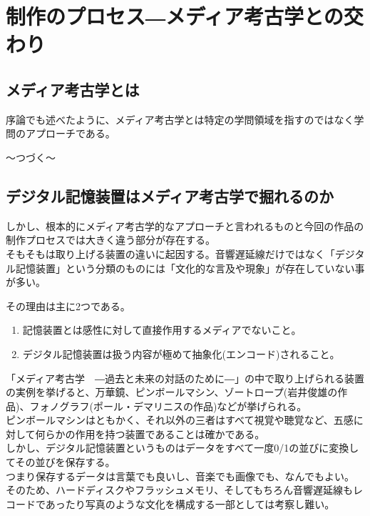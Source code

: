 \chapter{制作のプロセス―メディア考古学との交わり}\label{ux5236ux4f5cux306eux30d7ux30edux30bbux30b9ux30e1ux30c7ux30a3ux30a2ux8003ux53e4ux5b66ux3068ux306eux4ea4ux308fux308a}

\section{メディア考古学とは}\label{ux30e1ux30c7ux30a3ux30a2ux8003ux53e4ux5b66ux3068ux306f}

序論でも述べたように、メディア考古学とは特定の学問領域を指すのではなく学問のアプローチである。

〜つづく〜

\section{デジタル記憶装置はメディア考古学で掘れるのか}\label{ux30c7ux30b8ux30bfux30ebux8a18ux61b6ux88c5ux7f6eux306fux30e1ux30c7ux30a3ux30a2ux8003ux53e4ux5b66ux3067ux6398ux308cux308bux306eux304b}

しかし、根本的にメディア考古学的なアプローチと言われるものと今回の作品の制作プロセスでは大きく違う部分が存在する。\\
そもそもは取り上げる装置の違いに起因する。音響遅延線だけではなく「デジタル記憶装置」という分類のものには「文化的な言及や現象」が存在していない事が多い。

その理由は主に2つである。

\begin{enumerate}
\def\labelenumi{\arabic{enumi}.}
\tightlist
\item
  記憶装置とは感性に対して直接作用するメディアでないこと。
\item
  デジタル記憶装置は扱う内容が極めて抽象化(エンコード)されること。
\end{enumerate}

「メディア考古学　―過去と未来の対話のために―」の中で取り上げられる装置の実例を挙げると、万華鏡、ピンボールマシン、ゾートロープ(岩井俊雄の作品)、フォノグラフ(ポール・デマリニスの作品)などが挙げられる。\\
ピンボールマシンはともかく、それ以外の三者はすべて視覚や聴覚など、五感に対して何らかの作用を持つ装置であることは確かである。\\
しかし、デジタル記憶装置というものはデータをすべて一度0/1の並びに変換してその並びを保存する。\\
つまり保存するデータは言葉でも良いし、音楽でも画像でも、なんでもよい。\\
そのため、ハードディスクやフラッシュメモリ、そしてもちろん音響遅延線もレコードであったり写真のような文化を構成する一部としては考察し難い。

